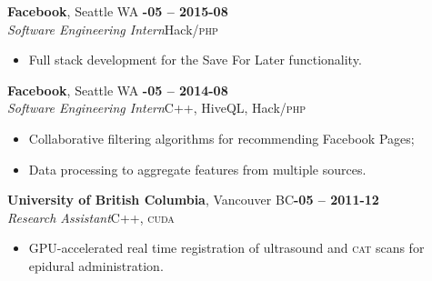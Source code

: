 \documentclass[margin,10pt]{res}
\begin{document}
\begin{resume}
    \textbf{Facebook}, Seattle WA \hfill \textsc{\bfseries{}-05 -- 2015-08}\\
    \textit{Software Engineering Intern}\hfill Hack/\textsc{php}
    \vspace{0.5em}
    \begin{itemize}
        \item Full stack development for the Save For Later functionality.
    \end{itemize}

    \textbf{Facebook}, Seattle WA \hfill \textsc{\bfseries{}-05 -- 2014-08}\\
    \textit{Software Engineering Intern}\hfill C++, HiveQL, Hack/\textsc{php}
    \vspace{0.5em}
    \begin{itemize}
        \item Collaborative filtering algorithms for recommending Facebook Pages;
        \item Data processing to aggregate features from multiple sources.
    \end{itemize}

    \textbf{University of British Columbia}, Vancouver BC\hfill \textsc{\bfseries{}-05 -- 2011-12}\\
    \textit{Research Assistant}\hfill C++, \textsc{cuda}
    \vspace{0.5em}
    \begin{itemize}
        \item GPU-accelerated real time registration of ultrasound and \textsc{cat} scans for epidural administration.
    \end{itemize}


\end{resume}
\end{document}
